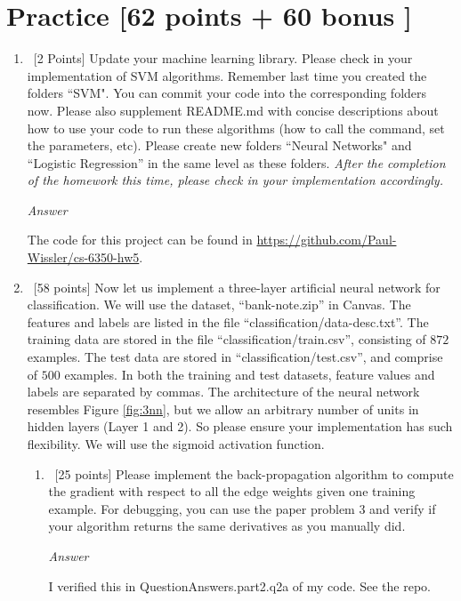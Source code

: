 \documentclass[12pt, fullpage,letterpaper]{article}
\begin{document}
\section{Practice [62 points + 60 bonus ]}
\begin{enumerate}
	\item~[2 Points] Update your machine learning library. Please check in your implementation of SVM algorithms. Remember last time you created the folders ``SVM". You can commit your code into the corresponding folders now. Please also supplement README.md with concise descriptions about how to use your code to run these algorithms (how to call the command, set the parameters, etc). Please create new folders ``Neural Networks" and ``Logistic Regression''  in the same level as these folders.  \textit{After the completion of the homework this time, please check in your implementation accordingly. }

    \emph{Answer}
    
    The code for this project can be found in \href{https://github.com/Paul-Wissler/cs-6350-hw5}{https://github.com/Paul-Wissler/cs-6350-hw5}.

	\item~[58 points] Now let us implement a three-layer artificial neural network for classification. We will use the dataset, ``bank-note.zip'' in Canvas. The features and labels are listed in the file ``classification/data-desc.txt''. The training data are stored in the file ``classification/train.csv'', consisting of $872$ examples. The test data are stored in ``classification/test.csv'', and comprise of $500$ examples. In both the training and test datasets, feature values and labels are separated by commas.
	The architecture of the neural network resembles Figure \ref{fig:3nn}, but we allow an arbitrary number of  units in hidden layers (Layer 1  and 2). So please ensure your implementation has such flexibility. We will use the sigmoid activation function. 

\begin{enumerate}
	\item ~[25 points] Please implement the back-propagation algorithm to compute the gradient with respect to all the edge weights given one training example.  For debugging, you can use the paper problem 3 and verify if your algorithm returns the same derivatives as you manually did. 
	
	\emph{Answer}
	
	I verified this in QuestionAnswers.part2.q2a of my code. See the repo.
	

\end{enumerate}
\end{enumerate}
\end{document}
